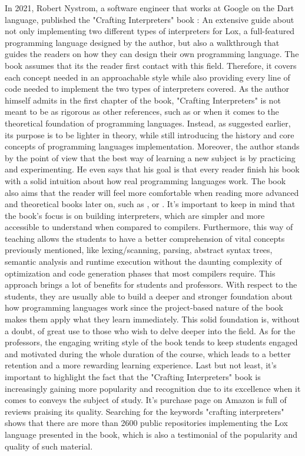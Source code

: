 In 2021, Robert Nystrom, a software engineer that works at Google on the Dart language, published the "Crafting Interpreters" book \cite{nystrom2021crafting}: An extensive guide about not only implementing two different types of interpreters for Lox, a full-featured programming language designed by the author, but also a walkthrough that guides the readers on how they can design their own programming language. The book assumes that its the reader first contact with this field. Therefore, it covers each concept needed in an approachable style while also providing every line of code needed to implement the two types of interpreters covered. As the author himself admits in the first chapter of the book, "Crafting Interpreters" is not meant to be as rigorous as other references, such as \cite{aho1986compilers} or \cite{cooper2022engineering} when it comes to the theoretical foundation of programming languages. Instead, as suggested earlier, its purpose is to be lighter in theory, while still introducing the history and core concepts of programming languages implementation. Moreover, the author stands by the point of view that the best way of learning a new subject is by practicing and experimenting. He even says that his goal is that every reader finish his book with a solid intuition about how real programming languages work. The book also aims that the reader will feel more comfortable when reading more advanced and theoretical books later on, such as \cite{aho1986compilers}, \cite{cooper2022engineering} or \cite{muchnick1997advanced}. It's important to keep in mind that the book's focus is on building interpreters, which are simpler and more accessible to understand when compared to compilers. Furthermore, this way of teaching allows the students to have a better comprehension of vital concepts previously mentioned, like lexing/scanning, parsing, abstract syntax trees, semantic analysis and runtime execution without the daunting complexity of optimization and code generation phases that most compilers require. This approach brings a lot of benefits for students and professors. With respect to the students, they are usually able to build a deeper and stronger foundation about how programming languages work since the project-based nature of the book makes them apply what they learn immediately. This solid foundation is, without a doubt, of great use to those who wish to delve deeper into the field. As for the professors, the engaging writing style of the book tends to keep students engaged and motivated during the whole duration of the course, which leads to a better retention and a more rewarding learning experience. Last but not least, it's important to highlight the fact that the "Crafting Interpreters" book is increasingly gaining more popularity and recognition due to its excellence when it comes to conveys the subject of study. It's purchase page on Amazon \cite{nystrom_crafting_interpreters_amazon} is full of reviews praising its quality. Searching for the keywords "crafting interpreters" \cite{crafting_interpreters_repositories_github} shows that there are more than 2600 public repositories implementing the Lox language presented in the book, which is also a testimonial of the popularity and quality of such material.

